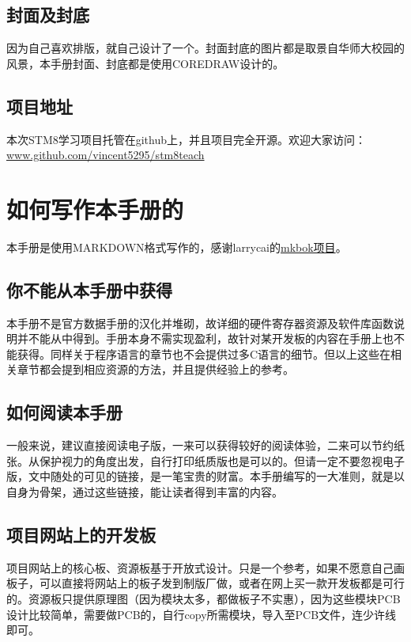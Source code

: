 \documentclass[a4paper]{book}
\begin{document}
\subsection*{封面及封底}

因为自己喜欢排版，就自己设计了一个。封面封底的图片都是取景自华师大校园的风景，本手册封面、封底都是使用COREDRAW设计的。

\subsection*{项目地址}

本次STM8学习项目托管在github上，并且项目完全开源。欢迎大家访问：\href{www.github.com/vincent5295/stm8teach}{www.github.com/vincent5295/stm8teach}

\section*{如何写作本手册的}

本手册是使用MARKDOWN格式写作的，感谢larrycai的\href{www.github.com/larrycai/mkbok}{mkbok项目}。

\subsection*{你不能从本手册中获得}

本手册不是官方数据手册的汉化并堆砌，故详细的硬件寄存器资源及软件库函数说明并不能从中得到。手册本身不需实现盈利，故针对某开发板的内容在手册上也不能获得。同样关于程序语言的章节也不会提供过多C语言的细节。但以上这些在相关章节都会提到相应资源的方法，并且提供经验上的参考。

\subsection*{如何阅读本手册}

一般来说，建议直接阅读电子版，一来可以获得较好的阅读体验，二来可以节约纸张。从保护视力的角度出发，自行打印纸质版也是可以的。但请一定不要忽视电子版，文中随处的可见的链接，是一笔宝贵的财富。本手册编写的一大准则，就是以自身为骨架，通过这些链接，能让读者得到丰富的内容。

\subsection*{项目网站上的开发板}

项目网站上的核心板、资源板基于开放式设计。只是一个参考，如果不愿意自己画板子，可以直接将网站上的板子发到制版厂做，或者在网上买一款开发板都是可行的。资源板只提供原理图（因为模块太多，都做板子不实惠），因为这些模块PCB设计比较简单，需要做PCB的，自行copy所需模块，导入至PCB文件，连少许线即可。
\end{document}
